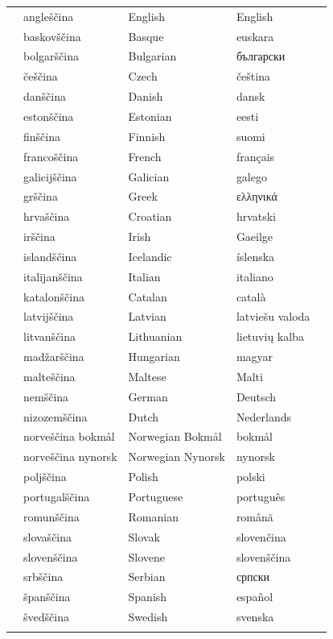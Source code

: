 \vspace*{-5mm}
\centering
  \setlength{\tabcolsep}{2em}
  \begin{tabularx}{\textwidth}{lllll} \toprule\addlinespace
  &angleščina & English & English& \\
  &baskovščina & Basque & euskara& \\
  &bolgarščina & Bulgarian & български& \\
  &češčina & Czech & čeština& \\
  &danščina & Danish & dansk& \\
  &estonščina & Estonian & eesti& \\
  &finščina & Finnish & suomi& \\
  &francoščina & French & français& \\
  &galicijščina & Galician & galego& \\
  &grščina & Greek & ελληνικά& \\
  &hrvaščina & Croatian & hrvatski& \\
  &irščina & Irish & Gaeilge& \\
  &islandščina & Icelandic & íslenska& \\
  &italijanščina & Italian & italiano& \\
  &katalonščina & Catalan & català& \\
  &latvijščina & Latvian & latviešu valoda& \\
  &litvanščina & Lithuanian & lietuvių kalba& \\
  &madžarščina & Hungarian & magyar& \\
  &malteščina & Maltese & Malti& \\
  &nemščina & German & Deutsch& \\
  &nizozemščina & Dutch & Nederlands& \\
  &norveščina bokmål & Norwegian Bokmål & bokmål& \\
  &norveščina nynorsk & Norwegian Nynorsk & nynorsk& \\
  &poljščina & Polish & polski& \\
  &portugalščina & Portuguese & português& \\
  &romunščina & Romanian & română& \\
  &slovaščina & Slovak & slovenčina& \\
  &slovenščina & Slovene & slovenščina& \\
  &srbščina & Serbian & српски& \\
  &španščina & Spanish & español& \\
  &švedščina & Swedish & svenska& \\ \addlinespace \bottomrule
\end{tabularx}
